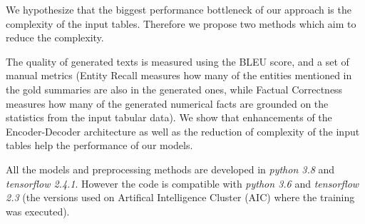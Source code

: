 We hypothesize that the biggest performance bottleneck of our approach is the complexity of the input tables. Therefore we propose two methods which aim to reduce the complexity.

The quality of generated texts is measured using the BLEU score, and a set of manual metrics (Entity Recall measures how many of the entities mentioned in the gold summaries are also in the generated ones, while Factual Correctness measures how many of the generated numerical facts are grounded on the statistics from the input tabular data). We show that enhancements of the Encoder-Decoder architecture as well as the reduction of complexity of the input tables help the performance of our models.

All the models and preprocessing methods are developed in \emph{python 3.8} and \emph{tensorflow 2.4.1}. However the code is compatible with \emph{python 3.6} and \emph{tensorflow 2.3} (the versions used on Artifical Intelligence Cluster (AIC) where the training was executed).